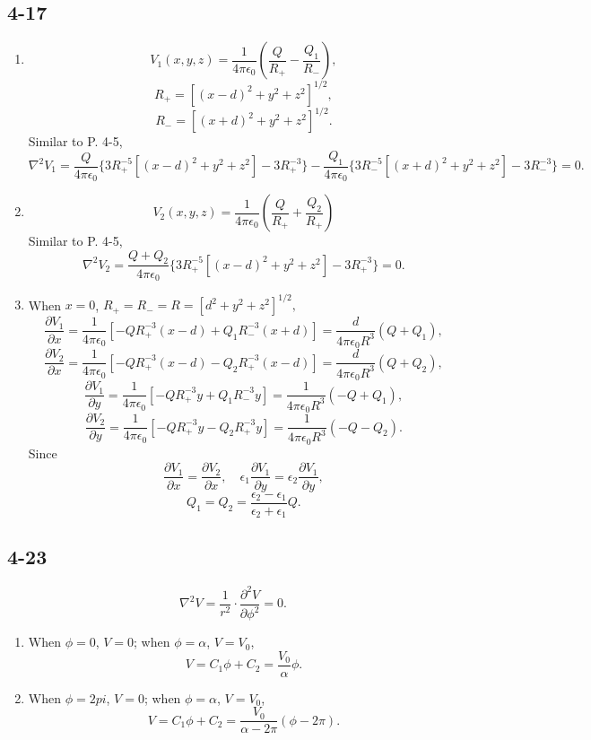 \documentclass[11pt,a4paper]{article}
\begin{document}
\subsection{4-17}
\begin{enumerate}[label=\alph*)]
\item
$$V_1(x,y,z)=\frac{1}{4\pi\epsilon_0}\left(\frac{Q}{R_+}-\frac{Q_1}{R_-}\right),$$
$$R_+=[(x-d)^2+y^2+z^2]^{1/2},$$
$$R_-=[(x+d)^2+y^2+z^2]^{1/2}.$$
Similar to P. 4-5,
$$\nabla^2 V_1=\frac{Q}{4\pi\epsilon_0}\{3R_+^{-5}[(x-d)^2+y^2+z^2]-3R_+^{-3}\}-\frac{Q_1}{4\pi\epsilon_0}\{3R_-^{-5}[(x+d)^2+y^2+z^2]-3R_-^{-3}\}=0.$$
\item
$$V_2(x,y,z)=\frac{1}{4\pi\epsilon_0}\left(\frac{Q}{R_+}+\frac{Q_2}{R_+}\right)$$
Similar to P. 4-5,
$$\nabla^2 V_2=\frac{Q+Q_2}{4\pi\epsilon_0}\{3R_+^{-5}[(x-d)^2+y^2+z^2]-3R_+^{-3}\}=0.$$
\item
When $x=0$, $R_+=R_-=R=[d^2+y^2+z^2]^{1/2},$
$$\frac{\partial V_1}{\partial x}=\frac{1}{4\pi\epsilon_0}[-QR_+^{-3}(x-d)+Q_1R_-^{-3}(x+d)]=\frac{d}{4\pi\epsilon_0R^3}(Q+Q_1),$$
$$\frac{\partial V_2}{\partial x}=\frac{1}{4\pi\epsilon_0}[-QR_+^{-3}(x-d)-Q_2R_+^{-3}(x-d)]=\frac{d}{4\pi\epsilon_0R^3}(Q+Q_2),$$
$$\frac{\partial V_1}{\partial y}=\frac{1}{4\pi\epsilon_0}[-QR_+^{-3}y+Q_1R_-^{-3}y]=\frac{1}{4\pi\epsilon_0R^3}(-Q+Q_1),$$
$$\frac{\partial V_2}{\partial y}=\frac{1}{4\pi\epsilon_0}[-QR_+^{-3}y-Q_2R_+^{-3}y]=\frac{1}{4\pi\epsilon_0R^3}(-Q-Q_2).$$
Since
$$\frac{\partial V_1}{\partial x}=\frac{\partial V_2}{\partial x},\quad\epsilon_1\frac{\partial V_1}{\partial y}=\epsilon_2\frac{\partial V_1}{\partial y},$$
$$Q_1=Q_2=\frac{\epsilon_2-\epsilon_1}{\epsilon_2+\epsilon_1}Q.$$
\end{enumerate}

\subsection{4-23}
$$\nabla^2 V=\frac{1}{r^2}\cdot\frac{\partial^2V}{\partial\phi^2}=0.$$
\begin{enumerate}[label=\alph*)]
\item
When $\phi=0$, $V=0$; when $\phi=\alpha$, $V=V_0$,
$$V=C_1\phi+C_2=\frac{V_0}{\alpha}\phi.$$
\item
When $\phi=2pi$, $V=0$; when $\phi=\alpha$, $V=V_0$,
$$V=C_1\phi+C_2=\frac{V_0}{\alpha-2\pi}(\phi-2\pi).$$
\end{enumerate}
\end{document}
